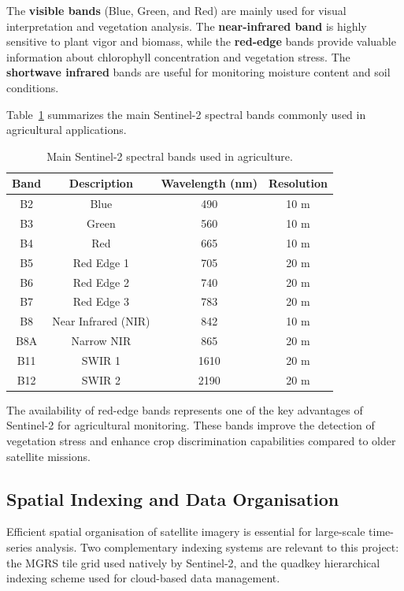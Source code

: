   The \textbf{visible bands} (Blue, Green, and Red) are mainly used for visual interpretation and vegetation analysis.
  The \textbf{near-infrared band} is highly sensitive to plant vigor and biomass, while the \textbf{red-edge} bands provide valuable
  information about chlorophyll concentration and vegetation stress. The \textbf{shortwave infrared} bands are useful for monitoring 
  moisture content and soil conditions. 
  
  Table~\ref{tab:sentinel2_bands} summarizes the main Sentinel-2 spectral bands commonly 
  used in agricultural applications. 

  \begin{table}[H] 
      \centering 
      \caption{Main Sentinel-2 spectral bands used in agriculture.} 
      \label{tab:sentinel2_bands} 
      \begin{tabular}{|c|c|c|c|} 
          \hline 
          \textbf{Band} & \textbf{Description} & \textbf{Wavelength (nm)} & \textbf{Resolution} \\ 
          \hline 
          B2  & Blue               & 490  & 10 m \\ 
          B3  & Green              & 560  & 10 m \\ 
          B4  & Red                & 665  & 10 m \\ 
          B5  & Red Edge 1         & 705  & 20 m \\ 
          B6  & Red Edge 2         & 740  & 20 m \\ 
          B7  & Red Edge 3         & 783  & 20 m \\ 
          B8  & Near Infrared (NIR)& 842  & 10 m \\ 
          B8A & Narrow NIR         & 865  & 20 m \\ 
          B11 & SWIR 1             & 1610 & 20 m \\ 
          B12 & SWIR 2             & 2190 & 20 m \\ 
          \hline 
      \end{tabular} 
  \end{table}

  The availability of red-edge bands represents one of the key advantages of Sentinel-2 for agricultural monitoring.
  These bands improve the detection of vegetation stress and enhance crop discrimination capabilities compared to older satellite missions.

  \subsection{Spatial Indexing and Data Organisation}
    Efficient spatial organisation of satellite imagery is essential 
  for large-scale time-series analysis. Two complementary indexing 
  systems are relevant to this project: the MGRS tile grid used 
  natively by Sentinel-2, and the quadkey hierarchical indexing 
  scheme used for cloud-based data management.
   
